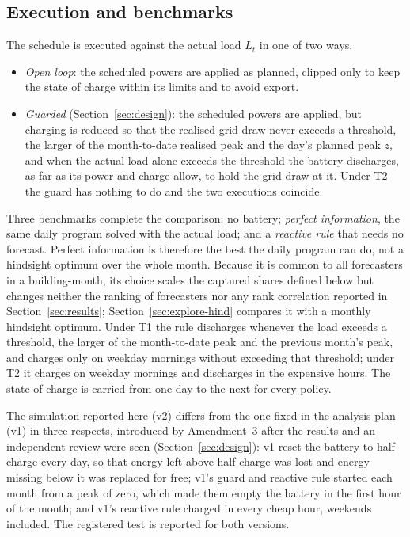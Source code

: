 \subsection{Execution and benchmarks}
The schedule is executed against the actual load $L_t$ in one of two ways.
\begin{itemize}
\item \emph{Open loop}: the scheduled powers are applied as planned, clipped only to keep the state of charge within its limits and to avoid export.
\item \emph{Guarded} (Section~\ref{sec:design}): the scheduled powers are applied, but charging is reduced so that the realised grid draw never exceeds a threshold, the larger of the month-to-date realised peak and the day's planned peak $z$, and when the actual load alone exceeds the threshold the battery discharges, as far as its power and charge allow, to hold the grid draw at it. Under T2 the guard has nothing to do and the two executions coincide.
\end{itemize}
Three benchmarks complete the comparison: no battery; \emph{perfect information}, the same daily program solved with the actual load; and a \emph{reactive rule} that needs no forecast. Perfect information is therefore the best the daily program can do, not a hindsight optimum over the whole month. Because it is common to all forecasters in a building-month, its choice scales the captured shares defined below but changes neither the ranking of forecasters nor any rank correlation reported in Section~\ref{sec:results}; Section~\ref{sec:explore-hind} compares it with a monthly hindsight optimum. Under T1 the rule discharges whenever the load exceeds a threshold, the larger of the month-to-date peak and the previous month's peak, and charges only on weekday mornings without exceeding that threshold; under T2 it charges on weekday mornings and discharges in the expensive hours. The state of charge is carried from one day to the next for every policy.

The simulation reported here (v2) differs from the one fixed in the analysis plan (v1) in three respects, introduced by Amendment~3 after the results and an independent review were seen (Section~\ref{sec:design}): v1 reset the battery to half charge every day, so that energy left above half charge was lost and energy missing below it was replaced for free; v1's guard and reactive rule started each month from a peak of zero, which made them empty the battery in the first hour of the month; and v1's reactive rule charged in every cheap hour, weekends included. The registered test is reported for both versions.

